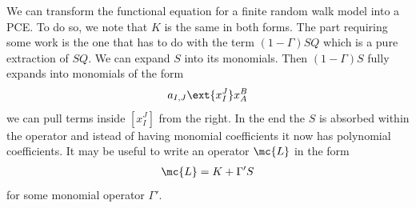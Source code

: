 \begin{example} We can transform the functional equation for a finite random walk model into a PCE. To do so, we note that $K$ is the same in both forms. The part requiring some work is the one that has to do with the term $(1-\Gamma)SQ$ which is a pure extraction of $SQ$. We can expand $S$ into its monomials. Then $(1-\Gamma)S$ fully expands into monomials of the form
\begin{align}
	a_{I,J}\ext{x_I^J}x_A^B
\end{align}
we can pull terms inside $[x_I^J]$ from the right. In the end the $S$ is absorbed within the operator and istead of having monomial coefficients it now has polynomial coefficients. It may be useful to write an operator $\mc{L}$ in the form
\begin{align}
	\mc{L} = K + \Gamma'S
\end{align}
for some monomial operator $\Gamma'$.
\end{example}

